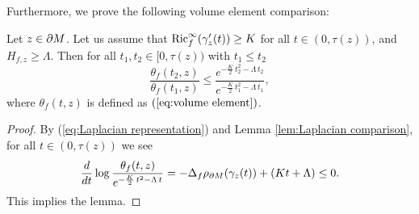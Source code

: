 Furthermore,
we prove the following volume element comparison:
\begin{lem}\label{lem:volume element comparison}
Let $z\in \partial M$.
Let us assume that
$\operatorname{Ric}^{\infty}_{f}(\gamma'_{z}(t))\geq K$ for all $t \in (0,\tau(z))$,
and $H_{f,z}\geq \Lambda$.
Then for all $t_{1},t_{2} \in [0,\tau(z))$ with $t_{1}\leq t_{2}$
\begin{equation*}
\frac{\theta_{f}(t_{2},z)}{ \theta_{f}(t_{1},z)}\leq \frac{e^{-\frac{K}{2}\,t^{2}_{2}-\Lambda\,t_{2}}}{ e^{-\frac{K}{2}\,t^{2}_{1}-\Lambda\,t_{1}}    },
\end{equation*}
where $\theta_{f}(t,z)$ is defined as $(\ref{eq:volume element})$.
\end{lem}
\begin{proof}
By (\ref{eq:Laplacian representation}) and Lemma \ref{lem:Laplacian comparison},
for all $t \in (0,\tau(z))$
we see
\begin{equation*}
\frac{d}{dt}\log \frac{\theta_{f}(t,z)}{  e^{-\frac{K}{2}\,t^{2}-\Lambda\,t}  }=-\Delta_{f}\rho_{\partial M}(\gamma_{z}(t))+\left(Kt +\Lambda  \right) \leq 0.
\end{equation*}
This implies the lemma.
\end{proof}

